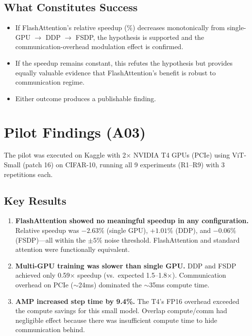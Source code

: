 \documentclass[12pt, a4paper]{article}
\begin{document}
\subsection{What Constitutes Success}
\begin{itemize}
    \item If FlashAttention's relative speedup (\%) decreases monotonically from single-GPU $\rightarrow$ DDP $\rightarrow$ FSDP, the hypothesis is supported and the communication-overhead modulation effect is confirmed.
    \item If the speedup remains constant, this refutes the hypothesis but provides equally valuable evidence that FlashAttention's benefit is robust to communication regime.
    \item Either outcome produces a publishable finding.
\end{itemize}

\section{Pilot Findings (A03)}

The pilot was executed on Kaggle with 2$\times$ NVIDIA T4 GPUs (PCIe) using ViT-Small (patch 16) on CIFAR-10, running all 9 experiments (R1--R9) with 3 repetitions each.

\subsection{Key Results}

\begin{enumerate}
    \item \textbf{FlashAttention showed no meaningful speedup in any configuration.} Relative speedup was $-2.63\%$ (single GPU), $+1.01\%$ (DDP), and $-0.06\%$ (FSDP)---all within the $\pm 5\%$ noise threshold. FlashAttention and standard attention were functionally equivalent.

    \item \textbf{Multi-GPU training was slower than single GPU.} DDP and FSDP achieved only 0.59$\times$ speedup (vs.\ expected 1.5--1.8$\times$). Communication overhead on PCIe ($\sim$24ms) dominated the $\sim$35ms compute time.

    \item \textbf{AMP increased step time by 9.4\%.} The T4's FP16 overhead exceeded the compute savings for this small model. Overlap compute/comm had negligible effect because there was insufficient compute time to hide communication behind.
\end{enumerate}
\end{document}
